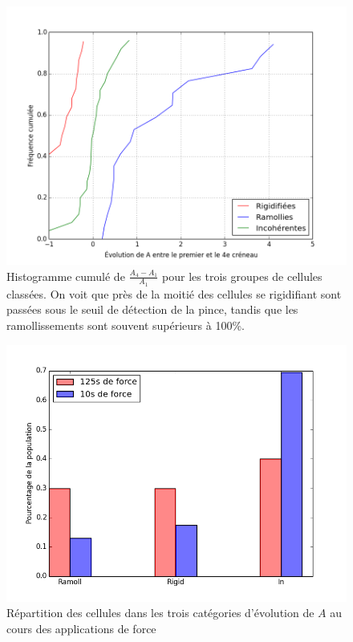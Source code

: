 \documentclass{report}
\begin{document}
\begin{figure}
\includegraphics[scale=0.5]{Figures/Evolution_J4-J0_sur_J0.png} 
\caption{Histogramme cumulé de $\frac{A_4-A_1}{A_1}$ pour les trois groupes de cellules classées. On voit que près de la moitié des cellules se rigidifiant sont passées sous le seuil de détection de la pince, tandis que les ramollissements sont souvent supérieurs à 100\%.  }
\end{figure}

\begin{figure}
\includegraphics[scale=0.5]{Figures/FRI_temoin_vs_C4.png} 
\caption{Répartition des cellules dans les trois catégories d'évolution de $A$ au cours des applications de force \label{FRI_temoin}}
\end{figure}
\end{document}
